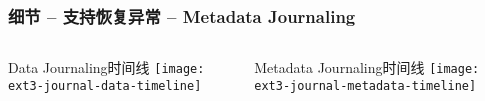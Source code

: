 \begin{frame}[fragile]
	\frametitle{细节 -- 支持恢复异常 -- Metadata Journaling}
	\begin{columns}[t]
		\begin{column}{.5\textwidth}
			\centering
			Data Journaling时间线
			\texttt{[image: ext3-journal-data-timeline]}


		\end{column}
		\begin{column}{.5\textwidth}	
			\centering
			Metadata Journaling时间线		
			\texttt{[image: ext3-journal-metadata-timeline]}
		\end{column}
	\end{columns}
	
\end{frame}

